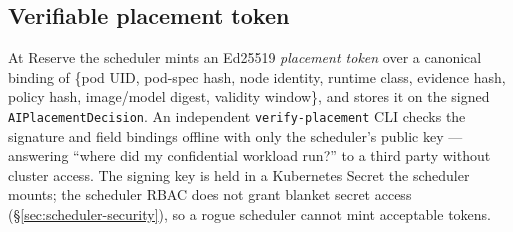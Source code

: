 \subsection{Verifiable placement token}
At Reserve the scheduler mints an Ed25519 \emph{placement token} over a canonical
binding of \{pod UID, pod-spec hash, node identity, runtime class, evidence hash,
policy hash, image/model digest, validity window\}, and stores it on the signed
\texttt{AIPlacementDecision}. An independent \texttt{verify-placement} CLI checks
the signature and field bindings offline with only the scheduler's public key ---
answering ``where did my confidential workload run?'' to a third party without
cluster access. The signing key is held in a Kubernetes Secret the scheduler
mounts; the scheduler RBAC does not grant blanket secret access
(\S\ref{sec:scheduler-security}), so a rogue scheduler cannot mint acceptable
tokens.
